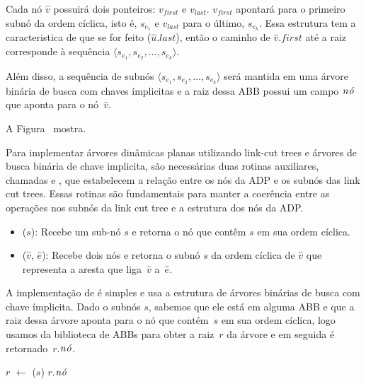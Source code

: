 Cada nó $\hat v$ possuirá dois ponteiros: $v_{first}$ e $v_{last}$.
$v_{first}$ apontará para o primeiro subnó da ordem cíclica, isto é, $s_{e_1}$ e $v_{last}$ para o último, $s_{e_k}$.
Essa estrutura tem a caracteristica de que se for feito \linkcutEvert($\hat u$.$last$), então o caminho de $\hat v$.$first$ até a raiz corresponde à sequência $\langle s_{e_1}, s_{e_2}, \ldots, s_{e_k}\rangle$.

Além disso, a sequência de subnós $\langle s_{e_1}, s_{e_2}, \ldots, s_{e_k}\rangle$ será mantida em uma árvore binária de busca com chaves ímplicitas e a raiz dessa ABB possui um campo $\mathit{n\acute{o}}$ que aponta para o nó~$\hat v$.

A Figura~ mostra.

Para implementar árvores dinâmicas planas utilizando link-cut trees e árvores de busca binária de chave implicita, são necessárias duas rotinas auxiliares, chamadas \LCOFindNode{} e \LCOFindSubNode{}, que estabelecem a relação entre os nós da ADP e os subnós das link cut trees.
Essas rotinas são fundamentais para manter a coerência entre as operações nos subnós da link cut tree e a estrutura dos nós da ADP.

\begin{itemize}
\item \LCOFindNode($s$): Recebe um sub-nó $s$ e retorna o nó que contêm $s$ em sua ordem cíclica.
\item \LCOFindSubNode($\hat v$, $\hat e$): Recebe dois nós e retorna o subnó $s$ da ordem cíclica de $\hat v$ que representa a aresta que liga~$\hat v$ a~$\hat e$.
\end{itemize}


A implementação de \LCOFindNode{} é simples e usa a estrutura de árvores binárias de busca com chave ímplicita.
Dado o subnós $s$, sabemos que ele está em alguma ABB e que a raiz dessa árvore aponta para o nó que contém~$s$ em sua ordem cíclica, logo usamos \treapGetRoot{} da biblioteca de ABBs para obter a raiz~$r$ da árvore e em seguida é retornado~$r$.$\mathit{n\acute{o}}$.

\begin{algorithm}[htb]
\caption{\LCOFindNode($s$)}
\label{Algo:LCOFindNode}
\begin{algorithmic}[1]
\State $r$ $\gets$ \treapGetRoot($s$)
\State \Return $r$.$\mathit{n\acute{o}}$
\end{algorithmic}
\end{algorithm}





